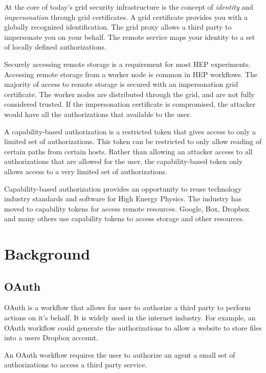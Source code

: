 \documentclass{webofc}
\begin{document}
At the core of today's grid security infrastructure is the concept of \textit{identity} and \textit{impersonation} through grid certificates. A grid certificate provides you with a globally recognized identification.  The grid proxy allows a third party to impersonate you on your behalf.  The remote service maps your identity to a set of locally defined authorizations.

Securely accessing remote storage is a requirement for most HEP experiments.  Accessing remote storage from a worker node is common in HEP workflows.  The majority of access to remote storage is secured with an impersonation grid certificate.  The worker nodes are distributed through the grid, and are not fully considered trusted.  If the impersonation certificate is compromised, the attacker would have all the authorizations that available to the user.

A capability-based authorization is a restricted token that gives access to only a limited set of authorizations.  This token can be restricted to only allow reading of certain paths from certain hosts.  Rather than allowing an attacker access to all authorizations that are allowed for the user, the capability-based token only allows access to a very limited set of authorizations.

Capability-based authorization provides an opportunity to reuse technology industry standards and software for High Energy Physics.  The industry has moved to capability tokens for access remote resources.  Google, Box, Dropbox and many others use capability tokens to access storage and other resources.

\section{Background}
\label{background}

\subsection{OAuth}
\label{sec:oauth}

OAuth is a workflow that allows for user to authorize a third party to perform actions on it's behalf.  It is widely used in the internet industry.  For example, an OAuth workflow could generate the authorizations to allow a website to store files into a users Dropbox account.

An OAuth workflow requires the user to authorize an agent a small set of authorizations to access a third party service.
\end{document}
